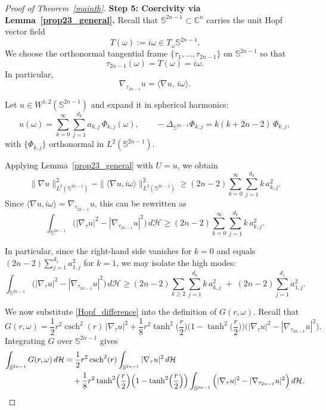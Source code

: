 \documentclass[11pt]{amsart}
\newcommand{\csch}{\operatorname{csch}}
\numberwithin{equation}{section}
\def\ge{\geqslant}
\begin{document}
\begin{proof}[Proof of Theorem~\ref{mainth}]
\medskip
\noindent\textbf{Step 5: Coercivity via Lemma~\ref{prop23_general}.}
Recall that $\mathbb S^{2n-1}\subset\mathbb C^n$ carries the unit Hopf vector field
\[
T(\omega):= i\omega\in T_\omega\mathbb S^{2n-1}.
\]
We choose the orthonormal tangential frame $\{\tau_1,\dots,\tau_{2n-1}\}$ on $\mathbb S^{2n-1}$
so that
\[
\tau_{2n-1}(\omega)=T(\omega)=i\omega.
\]
In particular,
\[
\nabla_{\tau_{2n-1}}u = \langle \nabla u,\, i\omega\rangle.
\]

\smallskip
Let $u\in W^{1,2}(\mathbb S^{2n-1})$ and expand it in spherical harmonics:
\[
u(\omega)=\sum_{k=0}^\infty\sum_{j=1}^{d_k} a_{k,j}\,\Phi_{k,j}(\omega),
\qquad
-\Delta_{\mathbb S^{2n-1}}\Phi_{k,j}=k(k+2n-2)\,\Phi_{k,j},
\]
with $\{\Phi_{k,j}\}$ orthonormal in $L^2(\mathbb S^{2n-1})$.

\smallskip
Applying Lemma~\ref{prop23_general} with $U=u$, we obtain
\begin{equation}\label{coercivity_hopf}
\|\nabla u\|_{L^2(\mathbb S^{2n-1})}^2
-\|\langle\nabla u,i\omega\rangle\|_{L^2(\mathbb S^{2n-1})}^2
\ge (2n-2)\sum_{k=0}^\infty\sum_{j=1}^{d_k} k\,a_{k,j}^2.
\end{equation}
Since $\langle\nabla u,i\omega\rangle=\nabla_{\tau_{2n-1}}u$, this can be rewritten as
\begin{equation}\label{Hopf_difference}
\int_{\mathbb S^{2n-1}}
\Big(|\nabla_\tau u|^2-|\nabla_{\tau_{2n-1}}u|^2\Big)\,d\mathcal H
\ge (2n-2)\sum_{k=0}^\infty\sum_{j=1}^{d_k} k\,a_{k,j}^2.
\end{equation}

\smallskip
In particular, since the right-hand side vanishes for $k=0$ and equals $(2n-2)\sum_{j=1}^{d_1}a_{1,j}^2$
for $k=1$, we may isolate the high modes:
\begin{equation}\label{Hopf_high_modes}
\int_{\mathbb S^{2n-1}}
\Big(|\nabla_\tau u|^2-|\nabla_{\tau_{2n-1}}u|^2\Big)\,d\mathcal H
\ge (2n-2)\sum_{k\ge 2}\sum_{j=1}^{d_k} k\,a_{k,j}^2
\;+\;(2n-2)\sum_{j=1}^{d_1}a_{1,j}^2.
\end{equation}

\smallskip
We now substitute \eqref{Hopf_difference} into the definition of $G(r,\omega)$.
Recall that
\[
G(r,\omega)
=\frac12 r^2\csch^2(r)\,|\nabla_\tau u|^2
+\frac18 r^2 \tanh^2\!\Big(\frac r2\Big)\Big(1-\tanh^2\!\Big(\frac r2\Big)\Big)
\Big(|\nabla_\tau u|^2-|\nabla_{\tau_{2n-1}}u|^2\Big).
\]
Integrating $G$ over $\mathbb S^{2n-1}$ gives
\begin{align}
\int_{\mathbb S^{2n-1}}G(r,\omega)\,d\mathcal H
&=
\frac12 r^2\csch^2(r)\int_{\mathbb S^{2n-1}}|\nabla_\tau u|^2\,d\mathcal H
\notag\\
&\quad
+\frac18 r^2 \tanh^2\!\Big(\frac r2\Big)\Big(1-\tanh^2\!\Big(\frac r2\Big)\Big)
\int_{\mathbb S^{2n-1}}
\Big(|\nabla_\tau u|^2-|\nabla_{\tau_{2n-1}}u|^2\Big)\,d\mathcal H.
\label{intG_split}
\end{align}


\end{proof}
\end{document}

